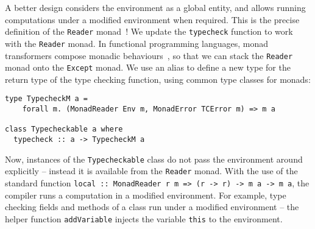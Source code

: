 \documentclass[sigplan,screen]{acmart}
\makeatletter
\newcommand{\ec}[1]{\lstinline[style=encore,breaklines=true,basicstyle=\fontsize{9}{9}\tt]@#1@}
\makeatother
\begin{document}
A better design considers the environment as a global entity, and allows running
computations under a modified environment when required.  This is the precise
definition of the \ec{Reader} monad~\cite{reader-writer-monad}!
We update the \ec{typecheck} function to work with the \ec{Reader} monad.
In functional programming languages, monad
transformers compose monadic behaviours~\cite{monad-transformers},
so that we can stack the \ec{Reader} monad onto the \ec{Except} monad.
%
%
%
We use an alias to define a new type for the return type of the type checking
function, using common type classes for monads:

\begin{minipage}[t]{\linewidth}
\begin{lstlisting}[style=encore]
type TypecheckM a =
    forall m. (MonadReader Env m, MonadError TCError m) => m a

class Typecheckable a where
  typecheck :: a -> TypecheckM a
\end{lstlisting}
\end{minipage}

Now, instances of the \ec{Typecheckable}
class do not pass the environment around explicitly -- instead it is available from
the \ec{Reader} monad. With the use of the standard function \ec{local :: MonadReader r m => (r -> r) -> m a -> m a},
the compiler runs a computation in a modified environment.
%
For example, type checking fields and methods of a class
run under a modified environment -- the helper function
\ec{addVariable} injects the variable \ec{this} to the environment.
\end{document}
